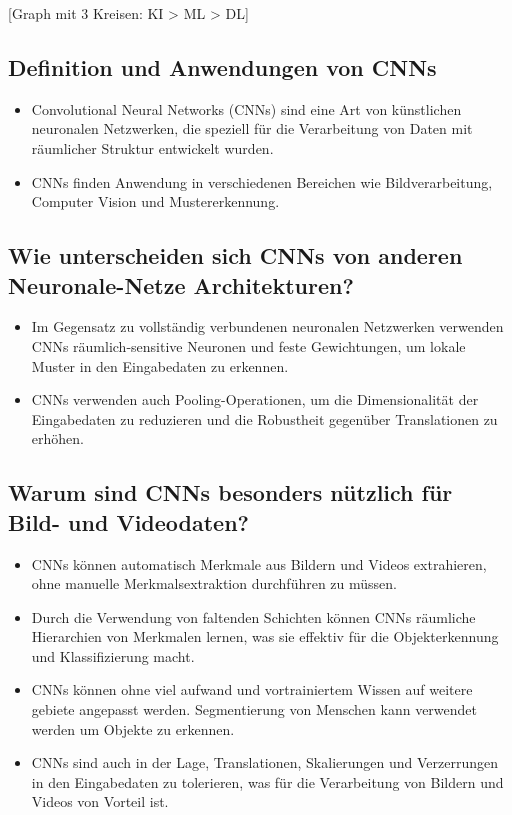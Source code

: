 [Graph mit 3 Kreisen: KI > ML > DL]

\subsection{Definition und Anwendungen von CNNs}
\begin{itemize}
  \item Convolutional Neural Networks (CNNs) sind eine Art von künstlichen neuronalen Netzwerken, die speziell für die Verarbeitung von Daten mit räumlicher Struktur entwickelt wurden.
  \item CNNs finden Anwendung in verschiedenen Bereichen wie Bildverarbeitung, Computer Vision und Mustererkennung.
\end{itemize}

\subsection{Wie unterscheiden sich CNNs von anderen Neuronale-Netze Architekturen?}
\begin{itemize}
  \item Im Gegensatz zu vollständig verbundenen neuronalen Netzwerken verwenden CNNs räumlich-sensitive Neuronen und feste Gewichtungen, um lokale Muster in den Eingabedaten zu erkennen.
  \item CNNs verwenden auch Pooling-Operationen, um die Dimensionalität der Eingabedaten zu reduzieren und die Robustheit gegenüber Translationen zu erhöhen.
\end{itemize}

\subsection{Warum sind CNNs besonders nützlich für Bild- und Videodaten?}
\begin{itemize}
  \item CNNs können automatisch Merkmale aus Bildern und Videos extrahieren, ohne manuelle Merkmalsextraktion durchführen zu müssen.
  \item Durch die Verwendung von faltenden Schichten können CNNs räumliche Hierarchien von Merkmalen lernen, was sie effektiv für die Objekterkennung und Klassifizierung macht.
  \item CNNs können ohne viel aufwand und vortrainiertem Wissen auf weitere gebiete angepasst werden. Segmentierung von Menschen kann verwendet werden um Objekte zu erkennen.
  \item CNNs sind auch in der Lage, Translationen, Skalierungen und Verzerrungen in den Eingabedaten zu tolerieren, was für die Verarbeitung von Bildern und Videos von Vorteil ist.
\end{itemize}

